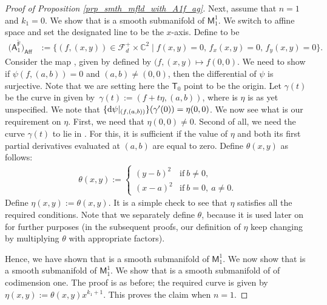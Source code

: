 \documentclass[pdftex]{sigma}
\numberwithin{equation}{section}
\begin{document}
\begin{proof}[Proof of Proposition \ref{prp_smth_mfld_with_A1f_ag}]
Next, assume that $n = 1$ and $k_1 = 0$. We show that
 is a smooth
submanifold of $\mathsf{M}_{1}^{1}$.
We switch to affine space and set the designated line to be the $x$-axis.
Define  to be
\begin{align}
\bigl(\overline{\mathsf{A}^{\mathsf{F}}_1\bigr)}_{\mathsf{Aff}}& :=
\big\{(f, (x,y)) \in \mathcal{F}_d^+\times \mathbb{C}^2 \mid  f(x, y) = 0,\, f_x(x,y) = 0,\, f_y(x,y) = 0\big\}.
\label{A1F_affine}
\end{align}
Consider the map
, given by
defined by
$(f, (x, y) \longmapsto  f(0, 0)$.
We need to show if $\psi(f, (a, b)) = 0$ and
$(a,b)\neq (0,0)$, then the differential of $\psi$
is surjective. Note that we are setting here the $\mathsf{T}_0$
point to be the origin. Let $\gamma (t)$ be the curve in
given by~$ {\gamma(t) :=  (f+t \eta, (a,b))}$,
where is $\eta$ is as yet unspecified. We note that
$\{{\rm d}\psi|_{(f, (a,b))}\}(\gamma^{\prime}(0)) = \eta(0,0)$.
We now see what is our requirement on $\eta$.
First, we need that $\eta(0, 0) \neq 0$.
Second of all, we need the curve $\gamma(t)$ to lie in
.
For this, it is sufficient if the value of $\eta$ and both its
first partial derivatives evaluated at $(a, b)$ are equal to zero.
Define $\theta(x, y)$ as follows:
\begin{align}
\label{theta_defn}
\theta(x, y) := \begin{cases} (y-b)^2 &\text{if} \  b  \neq 0, \\
              (x-a)^2 & \text{if} \  b = 0, \  a \neq 0.
       \end{cases}
\end{align}
Define $\eta(x, y) := \theta(x, y)$. It is a simple check to see that $\eta$ satisfies
all the required conditions. Note that we separately define $\theta$, because it is used
later on for further purposes (in the subsequent
proofs, our definition of $\eta$ keep changing by multiplying
$\theta$ with appropriate factors).

Hence, we have shown that
 is a smooth
submanifold of $\mathsf{M}_{1}^{1}$. We now show that
 is a smooth
submanifold of $\mathsf{M}_{1}^{1}$. We show that
 is a smooth submanifold
of  of codimension one.
The proof is as before; the required curve is given by
$\eta(x, y) := \theta(x,y)x^{k_1+1}$.
This proves the claim when $n = 1$.


\end{proof}
\end{document}
